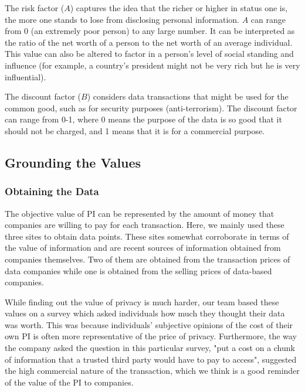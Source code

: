 \documentclass{icmmcm}
\begin{document}
The risk factor ($A$) captures the idea that the richer or higher in status one is, the more one stands to lose from disclosing personal information. $A$ can range from 0 (an extremely poor person) to any large number. It can be interpreted as the ratio of the net worth of a person to the net worth of an average individual. This value can also be altered to factor in a person's level of social standing and influence (for example, a country's president might not be very rich but he is very influential).

The discount factor ($B$) considers data transactions that might be used for the common good, such as for security purposes (anti-terrorism). The discount factor can range from 0-1, where 0 means the purpose of the data is so good that it should not be charged, and 1 means that it is for a commercial purpose. 

\subsection{Grounding the Values}
\subsubsection{Obtaining the Data}
The objective value of PI can be represented by the amount of money that companies are willing to pay for each transaction. Here, we mainly used these three sites to obtain data points. \citep{data_ft} \citep{data_totalm} \citep{data_tgd} These sites somewhat corroborate in terms of the value of information and are recent sources of information obtained from companies themselves. Two of them are obtained from the transaction prices of data companies while one is obtained from the selling prices of data-based companies.

While finding out the value of privacy is much harder, our team based these values on a survey which asked individuals how much they thought their data was worth. This was because individuals' subjective opinions of the cost of their own PI is often more representative of the price of privacy.
Furthermore, the way the company asked the question in this particular survey, "put a cost on a chunk of information that a trusted third party would have to pay to access", suggested the high commercial nature of the transaction, which we think is a good reminder of the value of the PI to companies. \citep{data_trendm}
\end{document}
